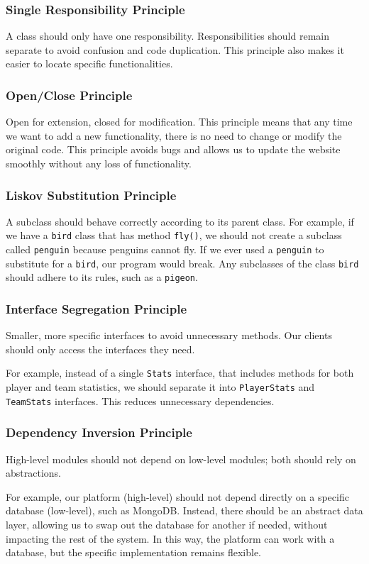 \documentclass{article}
\begin{document}
\subsubsection*{Single Responsibility Principle}
A class should only have one responsibility. Responsibilities should remain separate to avoid confusion and code duplication. This principle also makes it easier to locate specific functionalities.

\subsubsection*{Open/Close Principle}
Open for extension, closed for modification. This principle means that any time we want to add a new functionality, there is no need to change or modify the original code. This principle avoids bugs and allows us to update the website smoothly without any loss of functionality.
\subsubsection*{Liskov Substitution Principle}
A subclass should behave correctly according to its parent class. For example, if we have a \texttt{bird} class that has method \texttt{fly()}, we should not create a subclass called \texttt{penguin} because penguins cannot fly. If we ever used a \texttt{penguin} to substitute for a \texttt{bird}, our program would break. Any subclasses of the class \texttt{bird} should adhere to its rules, such as a \texttt{pigeon}.

\subsubsection*{Interface Segregation Principle}
Smaller, more specific interfaces to avoid unnecessary methods. Our clients should only access the interfaces they need. 

For example, instead of a single \texttt{Stats} interface, that includes methods for both player and team statistics, we should separate it into \texttt{PlayerStats} and \texttt{TeamStats} interfaces. This reduces unnecessary dependencies.

\subsubsection*{Dependency Inversion Principle}
High-level modules should not depend on low-level modules; both should rely on abstractions.

For example, our platform (high-level) should not depend directly on a specific database (low-level), such as MongoDB. Instead, there should be an abstract data layer, allowing us to swap out the database for another if needed, without impacting the rest of the system. In this way, the platform can work with a database, but the specific implementation remains flexible.
\end{document}
